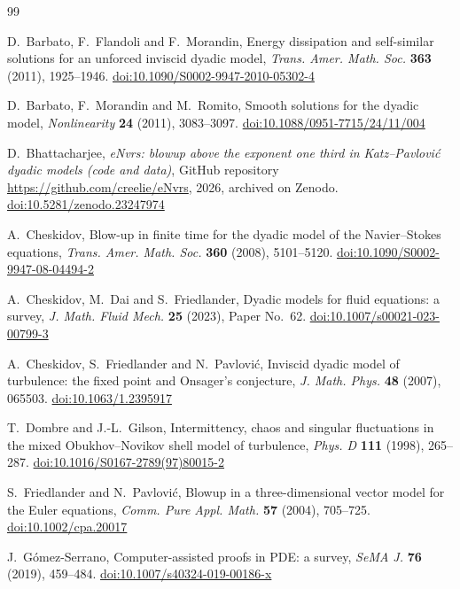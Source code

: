 \documentclass[12pt,reqno]{amsart}
\numberwithin{equation}{section}
\theoremstyle{plain}
\theoremstyle{definition}
\theoremstyle{remark}
\begin{document}
\begin{thebibliography}{99}

 D.~Barbato, F.~Flandoli and F.~Morandin, Energy dissipation
and self-similar solutions for an unforced inviscid dyadic model,
\emph{Trans. Amer. Math. Soc.} \textbf{363} (2011), 1925--1946.
\href{https://doi.org/10.1090/S0002-9947-2010-05302-4}{doi:10.1090/S0002-9947-2010-05302-4}

 D.~Barbato, F.~Morandin and M.~Romito, Smooth solutions for
the dyadic model, \emph{Nonlinearity} \textbf{24} (2011), 3083--3097.
\href{https://doi.org/10.1088/0951-7715/24/11/004}{doi:10.1088/0951-7715/24/11/004}

 D.~Bhattacharjee, \emph{eNvrs: blowup above the exponent one
third in Katz--Pavlovi\'c dyadic models (code and data)}, GitHub
repository \url{https://github.com/creelie/eNvrs}, 2026, archived on Zenodo.
\href{https://doi.org/10.5281/zenodo.23247974}{doi:10.5281/zenodo.23247974}

 A.~Cheskidov, Blow-up in finite time for the dyadic model
of the Navier--Stokes equations, \emph{Trans. Amer. Math. Soc.}
\textbf{360} (2008), 5101--5120.
\href{https://doi.org/10.1090/S0002-9947-08-04494-2}{doi:10.1090/S0002-9947-08-04494-2}

 A.~Cheskidov, M.~Dai and S.~Friedlander, Dyadic models for
fluid equations: a survey, \emph{J. Math. Fluid Mech.} \textbf{25} (2023),
Paper No.~62.
\href{https://doi.org/10.1007/s00021-023-00799-3}{doi:10.1007/s00021-023-00799-3}

 A.~Cheskidov, S.~Friedlander and N.~Pavlovi\'c, Inviscid
dyadic model of turbulence: the fixed point and Onsager's conjecture,
\emph{J. Math. Phys.} \textbf{48} (2007), 065503.
\href{https://doi.org/10.1063/1.2395917}{doi:10.1063/1.2395917}

 T.~Dombre and J.-L.~Gilson, Intermittency, chaos and
singular fluctuations in the mixed Obukhov--Novikov shell model of
turbulence, \emph{Phys. D} \textbf{111} (1998), 265--287.
\href{https://doi.org/10.1016/S0167-2789(97)80015-2}{doi:10.1016/S0167-2789(97)80015-2}

 S.~Friedlander and N.~Pavlovi\'c, Blowup in a
three-dimensional vector model for the Euler equations, \emph{Comm. Pure
Appl. Math.} \textbf{57} (2004), 705--725.
\href{https://doi.org/10.1002/cpa.20017}{doi:10.1002/cpa.20017}

 J.~G\'omez-Serrano, Computer-assisted proofs in PDE: a
survey, \emph{SeMA J.} \textbf{76} (2019), 459--484.
\href{https://doi.org/10.1007/s40324-019-00186-x}{doi:10.1007/s40324-019-00186-x}


\end{thebibliography}
\end{document}
